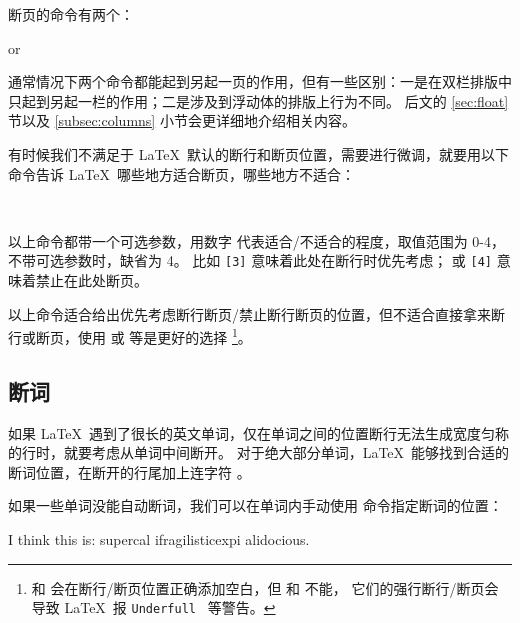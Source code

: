 断页的命令有两个：
\begin{command}
  \quad  or \quad {}
\end{command}

通常情况下两个命令都能起到另起一页的作用，但有一些区别：一是在双栏排版中  只起到另起一栏的作用；二是涉及到浮动体的排版上行为不同。
后文的 \ref{sec:float} 节以及 \ref{subsec:columns} 小节会更详细地介绍相关内容。

有时候我们不满足于 \LaTeX\ 默认的断行和断页位置，需要进行微调，就要用以下命令告诉 \LaTeX\ 哪些地方适合断页，哪些地方不适合：
\begin{command}
 \quad {} \\
 \quad {}
\end{command}

以上命令都带一个可选参数，用数字  代表适合/不适合的程度，取值范围为 0-4，不带可选参数时，缺省为 4。
比如 \texttt{[3]} 意味着此处在断行时优先考虑； 或 \texttt{[4]}
意味着禁止在此处断页。

以上命令适合给出优先考虑断行断页/禁止断行断页的位置，但不适合直接拿来断行或断页，使用  或  等是更好的选择%
\footnote{ 和  会在断行/断页位置正确添加空白，但  和  不能，
它们的强行断行/断页会导致 \LaTeX\ 报 \texttt{Underfull } 等警告。}。

\subsection{断词}\label{subsec:hyphen}

如果 \LaTeX\ 遇到了很长的英文单词，仅在单词之间的位置断行无法生成宽度匀称的行时，就要考虑从单词中间断开。
对于绝大部分单词，\LaTeX\ 能够找到合适的断词位置，在断开的行尾加上连字符 \char\hyphenchar\font 。

如果一些单词没能自动断词，我们可以在单词内手动使用 \cmd{-} 命令指定断词的位置：
\begin{example}
I think this is: su\-per\-cal\-%
i\-frag\-i\-lis\-tic\-ex\-pi\-%
al\-i\-do\-cious.
\end{example}

\endinput